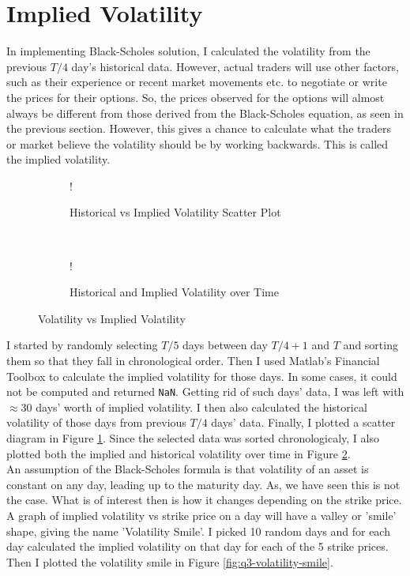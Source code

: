 \documentclass[11pt, fleqn]{article}
\begin{document}
\section{Implied Volatility}

In implementing Black-Scholes solution, I calculated the volatility from the previous $T/4$ day's historical data. However, actual traders will use other factors, such as their experience or recent market movements etc. to negotiate or write the prices for their options. So, the prices observed for the options will almost always be different from those derived from the Black-Scholes equation, as seen in the previous section. However, this gives a chance to calculate what the traders or market believe the volatility should be by working backwards. This is called the implied volatility.

\begin{figure}[!h]
   \centering 
   \begin{subfigure}[b]{0.45\textwidth}
     	\resizebox {\textwidth} {!} { }
		\caption{Historical vs Implied Volatility Scatter Plot}
		\label{fig:q3-historical-vs-implied-volatility}
    \end{subfigure}
    ~
    \begin{subfigure}[b]{0.44\textwidth}
       	\resizebox {\textwidth} {!} { }
		\caption{Historical and Implied Volatility over Time}
        \label{fig:q3-volatility-days}
    \end{subfigure}
    \caption{Volatility vs Implied Volatility}
	\label{fig:vol-vs-impl-vol}
\end{figure}

I started by randomly selecting $T/5$ days between day $T/4+1$ and $T$ and sorting them so that they fall in chronological order. Then I used Matlab's Financial Toolbox to calculate the implied volatility for those days. In some cases, it could not be computed and returned \texttt{NaN}. Getting rid of such days' data, I was left with $\approx 30$ days' worth of implied volatility. I then also calculated the historical volatility of those days from previous $T/4$ days' data. Finally, I plotted a scatter diagram in Figure \ref{fig:q3-historical-vs-implied-volatility}. Since the selected data was sorted chronologicaly, I also plotted both the implied and historical volatility over time in Figure \ref{fig:q3-volatility-days}.\\

An assumption of the Black-Scholes formula is that volatility of an asset is constant on any day, leading up to the maturity day. As, we have seen this is not the case. What is of interest then is how it changes depending on the strike price. A graph of implied volatility vs strike price on a day will have a valley or 'smile' shape, giving the name 'Volatility Smile'. I picked 10 random days and for each day calculated the implied volatility on that day for each of the 5 strike prices. Then I plotted the volatility smile in Figure \ref{fig:q3-volatility-smile}.
\end{document}
